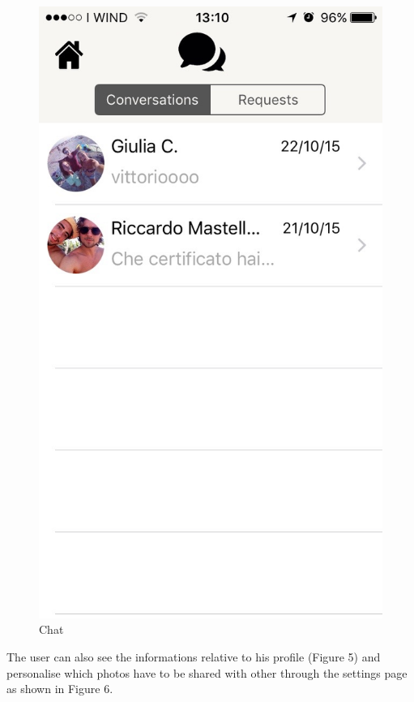 \begin{multicols}{2}
\begin{figure}[H]
\centering
\includegraphics[scale=0.15]{./images/chat.jpg}
\caption{\label{Augmented reality Experience}Chat}
\end{figure}
\end{multicols}

The user can also see the informations relative to his profile (Figure 5) and personalise which photos have to be shared with other through the settings page as shown in Figure 6.

